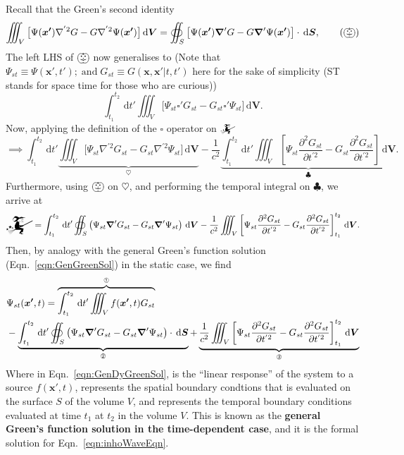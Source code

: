 \documentclass[12pt,english]{article}
\newcommand{\dmr}[1]{\, \mathrm{d}#1} %
\newcommand{\intt}[2]{\int_{#1}^{#2}} %
\renewcommand{\vec}[1]{\boldsymbol{#1}}
\begin{document}
Recall that the Green's second identity
\begin{equation}
    \iiint_V \big[\Psi(\vec{x'}) \nabla^{'2} G - G \nabla^{'2} \Psi(\vec{x'})\big] \dmr{\vec{V}} = \oiint_S \big[\Psi(\vec{x'})\grad'G - G\grad'\Psi(\vec{x'})\big] \cdot \dmr{\vec{S}}, \tag{$\bigpumpkin$}
\end{equation}
The left LHS of $\bigpumpkin$ now generalises to (Note that $\Psi_{st} \equiv \Psi(\vec{x'}, t'); \; \text{and} \; G_{st} \equiv G(\vec{x}, \vec{x'}|t, t')$ here for the sake of simplicity (ST stands for space time for those who are curious))
\begin{equation*}
    \intt{t_1}{t_2}\dmr{t'} \iiint_V \big[ \Psi_{st} \square' G_{st} - G_{st} \square' \Psi_{st} \big]\dmr{\vec{V}}. \tag{$\mathwitch$}
\end{equation*}
Now, applying the definition of the $\square$ operator on $\mathwitch$
\begin{equation*}
    \implies \intt{t_1}{t_2}\dmr{t'}\underbrace{\iiint_V\big[ \Psi_{st} \nabla^{'2}G_{st} - G_{st} \nabla^{'2} \Psi_{st} \big]\dmr{\vec{V}}}_{\heartsuit} - \frac{1}{c^2}\underbrace{\intt{t_1}{t_2}\dmr{t'}\iiint_V \left[\Psi_{st} \frac{\partial^2G_{st}}{\partial t^{'2}} - G_{st} \frac{\partial^2 G_{st}}{\partial t^{'2}} \right]\dmr{\vec{V}}}_{\clubsuit}.
\end{equation*}
Furthermore, using $\bigpumpkin$ on $\heartsuit$, and performing the temporal integral on $\clubsuit$, we arrive at
\small
\begin{equation}
    \mathwitch = \intt{t_1}{t_2}\dmr{t'}\oiint_S\left(\Psi_{st} \grad' G_{st} - G_{st} \grad' \Psi_{st}\right)\dmr{\vec{V}} - \frac{1}{c^2}\iiint_V\left[\Psi_{st} \frac{\partial^2 G_{st}}{\partial t^{'2}} - G_{st} \frac{\partial^2 G_{st}}{\partial t^{'2}}\right]_{t_1}^{t_2}\dmr{\vec{V}}.
\end{equation}
\normalsize
Then, by analogy with the general Green's function solution (Eqn.~\ref{eqn:GenGreenSol}) in the static case, we find
\begin{equation}
    \begin{split}
        &\Psi_{st}(\vec{x'}, t) = \overbrace{\intt{t_1}{t_2}\dmr{t'}\iiint_V f(\vec{x'}, t) G_{st}}^{\text{\ding{192}}} \\
        &- \underbrace{\intt{t_1}{t_2}\dmr{t'}\oiint_S \left( \Psi_{st}\grad' G_{st} - G_{st}\grad'\Psi_{st} \right)\cdot\dmr{\vec{S}}}_{\text{\ding{193}}} + \underbrace{\frac{1}{c^2}\iiint_V \left[\Psi_{st} \frac{\partial^2 G_{st}}{\partial t^{'2}} - G_{st} \frac{\partial^2 G_{st}}{\partial t^{'2}}\right]_{t_1}^{t_2}\dmr{\vec{V}}}_{\text{\ding{194}}}\label{eqn:GenDyGreenSol}
    \end{split}
\end{equation}
Where in Eqn.~\ref{eqn:GenDyGreenSol},  is the ``linear response'' of the system to a source $f(\vec{x'}, t)$,  represents the spatial boundary condtions that is evaluated on the surface $S$ of the volume $V$, and  represents the temporal boundary conditions evaluated at time $t_1$ at $t_2$ in the volume $V$. This is known as the \textbf{general Green's function solution in the time-dependent case}, and it is the formal solution for Eqn.~\ref{eqn:inhoWaveEqn}.
\end{document}
